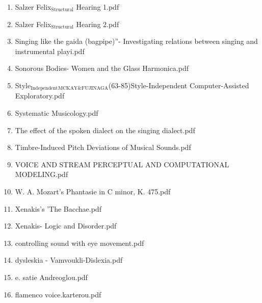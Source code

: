\documentclass[11pt]{article}
\begin{document}
\begin{enumerate}
\item Salzer Felix$_{\text{Structural}}$ Hearing 1.pdf
\label{sec-1-1-1-1-11-19-27-31}

\item Salzer Felix$_{\text{Structural}}$ Hearing 2.pdf
\label{sec-1-1-1-1-11-19-27-32}

\item Singing like the gaida (bagpipe)”- Investigating relations between singing and instrumental playi.pdf
\label{sec-1-1-1-1-11-19-27-33}

\item Sonorous Bodies- Women and the Glass Harmonica.pdf
\label{sec-1-1-1-1-11-19-27-34}

\item Style$_{\text{Independent}}$$_{\text{MCKAY\&FUJINAGA}}$(63-85)Style-Independent Computer-Assisted Exploratory.pdf
\label{sec-1-1-1-1-11-19-27-35}

\item Systematic Musicology.pdf
\label{sec-1-1-1-1-11-19-27-36}

\item The effect of the spoken dialect on the singing dialect.pdf
\label{sec-1-1-1-1-11-19-27-37}

\item Timbre-Induced Pitch Deviations of Musical Sounds.pdf
\label{sec-1-1-1-1-11-19-27-38}

\item VOICE AND STREAM  PERCEPTUAL AND COMPUTATIONAL MODELING.pdf
\label{sec-1-1-1-1-11-19-27-39}

\item W. A. Mozart’s Phantasie in C minor, K. 475.pdf
\label{sec-1-1-1-1-11-19-27-40}

\item Xenakis's 'The Bacchae.pdf
\label{sec-1-1-1-1-11-19-27-41}

\item Xenakis- Logic and Disorder.pdf
\label{sec-1-1-1-1-11-19-27-42}

\item controlling sound with eye movement.pdf
\label{sec-1-1-1-1-11-19-27-43}

\item dysleskia - Vamvoukli-Dislexia.pdf
\label{sec-1-1-1-1-11-19-27-44}

\item e. satie Andreoglou.pdf
\label{sec-1-1-1-1-11-19-27-45}

\item flamenco voice.karterou.pdf
\label{sec-1-1-1-1-11-19-27-46}


\end{enumerate}
\end{document}
